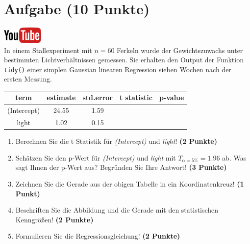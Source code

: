 \documentclass[a4paper, 10pt]{scrartcl}\usepackage[]{graphicx}\usepackage[]{xcolor}
\begin{document}
\section{Aufgabe \hfill (10 Punkte)}

\hfill\href{https://youtu.be/lJp8rFmMnrs}{\includegraphics[width =
  2cm]{img/youtube}}\\[1Ex]



In einem Stallexperiment mit $n = 60$ Ferkeln wurde der
Gewichtszuwachs unter bestimmten Lichtverh{\"a}ltnissen gemessen. Sie erhalten
den \Rlogo Output der Funktion \texttt{tidy()} einer simplen Gaussian linearen
Regression sieben Wochen nach der ersten Messung.

\begin{table}[!h]
\centering\begingroup\fontsize{14}{16}\selectfont

\begin{tabular}{ccccc}
\toprule
term & estimate & std.error & t statistic & p-value\\
\midrule
(Intercept) & 24.55 & 1.59 &  & \\
light & 1.02 & 0.15 &  & \\
\bottomrule
\end{tabular}
\endgroup{}
\end{table}



\begin{enumerate}
\item Berechnen Sie die t Statistik f{\"u}r \textit{(Intercept)} und
  \textit{light}! \textbf{(2 Punkte)}
\item Sch{\"a}tzen Sie den p-Wert f{\"u}r \textit{(Intercept)} und
  \textit{light} mit $T_{\alpha = 5\%} = 1.96$ ab. Was sagt Ihnen der p-Wert aus?
  Begr{\"u}nden Sie Ihre Antwort! \textbf{(3 Punkte)}
\item Zeichnen Sie die Gerade aus der obigen Tabelle in ein Koordinatenkreuz! \textbf{(1 Punkt)}
\item Beschriften Sie die Abbildung und die Gerade mit den statistischen
  Kenngr{\"o}{\ss}en! \textbf{(2 Punkte)}
\item Formulieren Sie die Regressionsgleichung! \textbf{(2 Punkte)}
\end{enumerate} 
\clearpage
\end{document}
